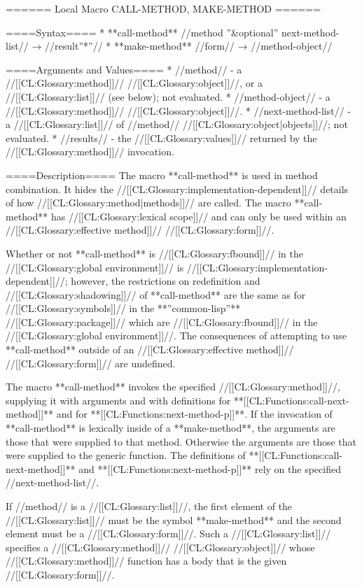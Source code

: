 ====== Local Macro CALL-METHOD, MAKE-METHOD ======

====Syntax====
  * **call-method** //method ''&optional'' next-method-list// → //result''*''//
  * **make-method** //form// → //method-object//

====Arguments and Values====
  * //method// - a //[[CL:Glossary:method]]// //[[CL:Glossary:object]]//, or a //[[CL:Glossary:list]]// (see below); not evaluated.
  * //method-object// - a //[[CL:Glossary:method]]// //[[CL:Glossary:object]]//.
  * //next-method-list// - a //[[CL:Glossary:list]]// of //method// //[[CL:Glossary:object|objects]]//; not evaluated.
  * //results// - the //[[CL:Glossary:values]]// returned by the //[[CL:Glossary:method]]// invocation.

====Description====
The macro **call-method** is used in method combination. It hides the //[[CL:Glossary:implementation-dependent]]// details of how //[[CL:Glossary:method|methods]]// are called. The macro **call-method** has //[[CL:Glossary:lexical scope]]// and can only be used within an //[[CL:Glossary:effective method]]// //[[CL:Glossary:form]]//.


Whether or not **call-method** is //[[CL:Glossary:fbound]]// in the //[[CL:Glossary:global environment]]// is //[[CL:Glossary:implementation-dependent]]//; however, the restrictions on redefinition and //[[CL:Glossary:shadowing]]// of **call-method** are the same as for //[[CL:Glossary:symbols]]// in the **''common-lisp''** //[[CL:Glossary:package]]//  which are //[[CL:Glossary:fbound]]// in the //[[CL:Glossary:global environment]]//. The consequences of attempting to use **call-method** outside of an //[[CL:Glossary:effective method]]// //[[CL:Glossary:form]]// are undefined.

The macro **call-method** invokes the specified //[[CL:Glossary:method]]//, supplying it with arguments and with definitions for **[[CL:Functions:call-next-method]]** and for **[[CL:Functions:next-method-p]]**. If the invocation of **call-method** is lexically inside of a **make-method**, the arguments are those that were supplied to that method. Otherwise the arguments are those that were supplied to the generic function. The definitions of **[[CL:Functions:call-next-method]]** and **[[CL:Functions:next-method-p]]** rely on the specified //next-method-list//.

If //method// is a //[[CL:Glossary:list]]//, the first element of the //[[CL:Glossary:list]]// must be the symbol **make-method** and the second element must be a //[[CL:Glossary:form]]//. Such a //[[CL:Glossary:list]]// specifies a //[[CL:Glossary:method]]// //[[CL:Glossary:object]]// whose //[[CL:Glossary:method]]// function has a body that is the given //[[CL:Glossary:form]]//.

